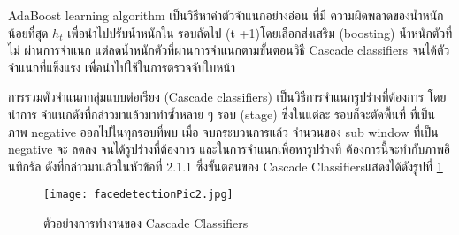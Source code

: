 \begin{enumerate}
AdaBoost learning algorithm เป็นวิธีหาค่าตัวจําแนกอย่างอ่อน ที่มี ความผิดพลาดของน้ำหนักน้อยที่สุด $h_t$ เพื่อนําไปปรับน้ำหนักใน รอบถัดไป (t +1)โดยเลือกส่งเสริม (boosting) น้ำหนักตัวที่ไม่ ผ่านการจําแนก แต่ลดน้ำหนักตัวที่ผ่านการจําแนกตามขั้นตอนวิธี Cascade classifiers จนได้ตัวจําแนกที่แข็งแรง เพื่อนําไปใช้ในการตรวจจับใบหน้า

  การรวมตัวจำแนกกลุ่มแบบต่อเรียง (Cascade classifiers) เป็นวิธีการจําแนกรูปร่างที่ต้องการ โดยนําการ จําแนกดังที่กล่าวมาแล้วมาทําซ้ำหลาย ๆ รอบ (stage) ซึ่งในแต่ละ รอบก็จะตัดพื้นที่ ที่เป็นภาพ negative ออกไปในทุกรอบที่พบ เมื่อ จบกระบวนการแล้ว จํานวนของ sub window ที่เป็น negative จะ ลดลง จนได้รูปร่างที่ต้องการ และในการจําแนกเพื่อหารูปร่างที่ ต้องการนี้จะทํากับภาพอินทิกรัล ดังที่กล่าวมาแล้วในหัวข้อที่ 2.1.1 ซึ่งขั้นตอนของ Cascade Classifiersแสดงได้ดังรูปที่ \ref{fig:facedetectionPic2}
 \begin{center}
 \begin{figure}[t]
  \centerline{
    \texttt{[image: facedetectionPic2.jpg]}
    }
  \centering
  \caption{ตัวอย่างการทำงานของ Cascade Classifiers}
  \label{fig:facedetectionPic2}
  \hrulefill
\end{figure}
   \end{center}
\end{enumerate}

